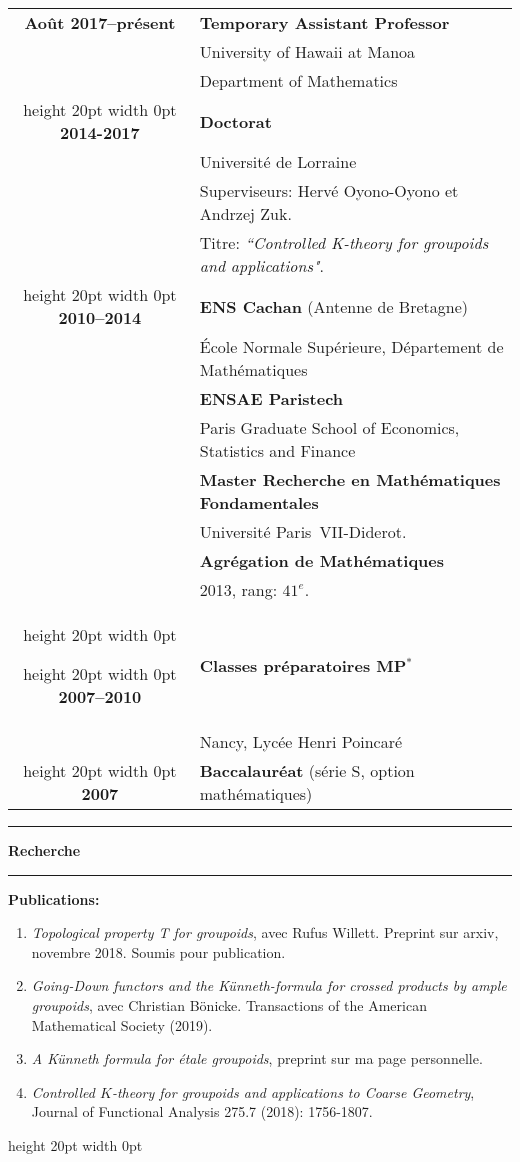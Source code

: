 \documentclass[a4paper,11pt]{article}
\newcommand\espace{\vrule height 20pt width 0pt}
\newcommand{\titre}[1]{%
	\begin{center}
	\bigskip
	\rule{\textwidth}{1pt}
	\par\vspace{0.1cm}
        \textbf{\large #1}
	\par\rule{\textwidth}{1pt}
	\end{center}
	\bigskip
	}
\begin{document}
\begin{tabular}{cp{}}

\textbf{Ao\^{u}t 2017--pr\'esent} &  \textbf{Temporary Assistant Professor} \\	
					& University of Hawaii at Manoa \\
						& Department of Mathematics\\
\espace
\textbf{2014-2017} &  \textbf{Doctorat} \\
			& Universit\'e de Lorraine \\
			& Superviseurs: Hervé Oyono-Oyono et Andrzej Zuk.\\ 
						& Titre: \textit{``Controlled K-theory for groupoids and applications"}. \\
\espace
\textbf{2010--2014} &  \textbf{ENS Cachan} (Antenne de Bretagne) \\
				    & 	\'Ecole Normale Supérieure, D\'epartement de Math\'ematiques \\
                              & \textbf{ENSAE Paristech}\\
				   & Paris Graduate School of Economics, Statistics and Finance\\
                                   & \textbf{Master Recherche en Math\'ematiques Fondamentales}\\  & Universit\'e Paris~VII-Diderot. \\
                                   & \textbf{Agrégation de Mathématiques} \\
				& 2013, rang: $41^e$. \\
\espace

\espace
\textbf{2007--2010} &\textbf{Classes préparatoires MP$^*$ } \\
					& Nancy, Lycée Henri Poincaré\\

\espace
\textbf{2007} & \textbf{Baccalauréat} (série S, option math\'ematiques) 
 \\

\end{tabular}

\newpage
\titre{Recherche}

\textbf{Publications:} 
\begin{enumerate}
\item \textit{Topological property T for groupoids}, avec Rufus Willett. Preprint sur arxiv, novembre 2018. Soumis pour publication.
\item \textit{Going-Down functors and the Künneth-formula for crossed products by ample groupoids}, avec Christian Bönicke. Transactions of the American Mathematical Society (2019).
\item \textit{A K\"{u}nneth formula for \'etale groupoids}, preprint sur ma page personnelle.
\item \textit{Controlled $K$-theory for groupoids and applications to Coarse Geometry}, Journal of Functional Analysis 275.7 (2018): 1756-1807.
\end{enumerate}
\espace
\end{document}
